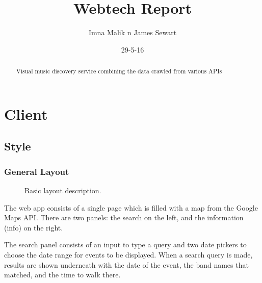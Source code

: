 \documentclass[10pt]{article}
\title{Webtech Report}
\author{Imna Malik n James Sewart}
\date{29-5-16}
\begin{document}
    \maketitle

    \tableofcontents


    \begin{abstract}
        Visual music discovery service combining the data crawled from various APIs
    \end{abstract}

    \section{Client}
        \subsection{Style}
            \subsubsection{General Layout}
                \begin{figure}[!ht]
                  \centering
                  \caption{Basic layout description.}
                \end{figure}

                The web app consists of a single page which is filled with a map from the Google Maps API. There are two panels: the search on the left, and the information (info) on the right. 

                The search panel consists of an input to type a query and two date pickers to choose the date range for events to be displayed. When a search query is made, results are shown underneath with the date of the event, the band names that matched, and the time to walk there.
\end{document}
